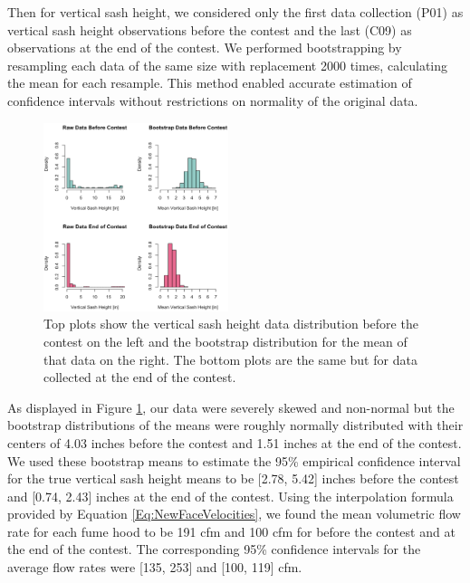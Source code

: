 \documentclass[12pt, twocolumn]{article}
\begin{document}
Then for vertical sash height, we considered only the first data collection (P01) as vertical sash height observations before the contest and the last (C09) as observations at the end of the contest. We performed bootstrapping by resampling each data of the same size with replacement 2000 times, calculating the mean for each resample. This method enabled accurate estimation of confidence intervals without restrictions on normality of the original data.
\begin{figure}[ht!]	
	\centering
	\includegraphics[width=0.48\textwidth]{Images/FumeHoodAnalysis_BootStrapDistribution.png}
	\caption{Top plots show the vertical sash height data distribution before the contest on the left and the bootstrap distribution for the mean of that data on the right. The bottom plots are the same but for data collected at the end of the contest. }
	\label{Fig:BootStrapDistribution}
\end{figure}
\newline
As displayed in Figure \ref{Fig:BootStrapDistribution}, our data were severely skewed and non-normal but the bootstrap distributions of the means were roughly normally distributed with their centers of 4.03 inches before the contest and 1.51 inches at the end of the contest.  We used these bootstrap means to estimate the 95\% empirical confidence interval for the true vertical sash height means to be [2.78,  5.42] inches before the contest and [0.74, 2.43] inches at the end of the contest. Using the interpolation formula provided by Equation \ref{Eq:NewFaceVelocities}, we found the mean volumetric flow rate for each fume hood to be 191 cfm and 100 cfm for before the contest and at the end of the contest. The corresponding 95\% confidence intervals for the average flow rates were [135, 253] and [100, 119] cfm. 
\end{document}

